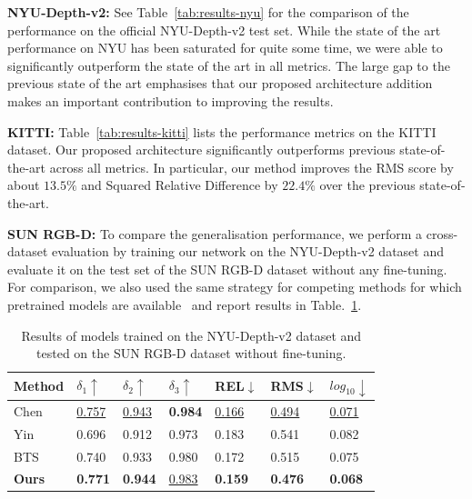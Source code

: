 \documentclass[final]{cvpr}
\begin{document}
\textbf{NYU-Depth-v2:} 
See Table~\ref{tab:results-nyu} for the comparison of the performance on the official NYU-Depth-v2 test set. While the state of the art performance on NYU has been saturated for quite some time, we were able to significantly outperform the state of the art in all metrics. The large gap to the previous state of the art emphasises that our proposed architecture addition makes an important contribution to improving the results.

\textbf{KITTI:} 
Table~\ref{tab:results-kitti} lists the performance metrics on the KITTI dataset. Our proposed architecture significantly outperforms previous state-of-the-art across all metrics. In particular, our method improves the RMS score by about $13.5\%$ and Squared Relative Difference by $22.4\%$ over the previous state-of-the-art. 


\textbf{SUN RGB-D:}
To compare the generalisation performance, we perform a cross-dataset evaluation by training our network on the NYU-Depth-v2 dataset and evaluate it on the test set of the SUN RGB-D dataset without any fine-tuning. For comparison, we also used the same strategy for competing methods for which pretrained models are available~\cite{bts_lee2019big,Yin_2019_ICCV,ijcai2019-98} and report results in Table.~\ref{tab:generalization}.

\begin{table}[t]
\centering
\begin{adjustbox}{width=\linewidth,center}
\begin{tabular}{@{}lllllll@{}}
\toprule
Method        & $\delta_1\uparrow$     & $\delta_2\uparrow$             & $\delta_3\uparrow$          & REL$\downarrow$         & RMS$\downarrow$  & $log_{10}\downarrow$\\ \midrule
Chen~\cite{ijcai2019-98}        & \underline{0.757}          & \underline{0.943}          & \textbf{0.984}         & \underline{0.166}          & \underline{0.494}  &  \underline{0.071}\\
Yin~\cite{Yin_2019_ICCV}        & 0.696          & 0.912          & 0.973          & 0.183          &  0.541  &  0.082\\
BTS~\cite{bts_lee2019big}            & 0.740          & 0.933          & 0.980          & 0.172          & 0.515  &  0.075 \\ \midrule
\textbf{Ours}                       & \textbf{0.771}  & \textbf{0.944} & \underline{0.983} & \textbf{0.159} & \textbf{0.476}  &  \textbf{0.068} \\
\bottomrule
\end{tabular}
\end{adjustbox}
\caption{Results of models trained on the NYU-Depth-v2 dataset and tested on the SUN RGB-D dataset \cite{Song2015_sunrgbd} without fine-tuning.}
\label{tab:generalization}
\end{table}
\end{document}
